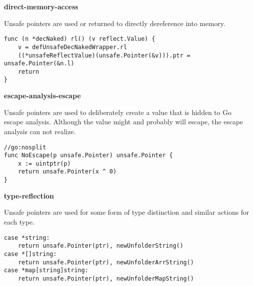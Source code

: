 \textbf{direct-memory-access}

Unsafe pointers are used or returned to directly dereference into memory.

\begin{lstlisting}[language=Golang, label=lst:survey-small-classexample-direct-memory-access, caption=Usage class example: direct-memory-access]
func (n *decNaked) rl() (v reflect.Value) {
    v = defUnsafeDecNakedWrapper.rl
    ((*unsafeReflectValue)(unsafe.Pointer(&v))).ptr = unsafe.Pointer(&n.l)
    return
}
\end{lstlisting}


\textbf{escape-analysis-escape}

Unsafe pointers are used to deliberately create a value that is hidden to Go escape analysis.
Although the value might and probably will escape, the escape analysis can not realize.

\begin{lstlisting}[language=Golang, label=lst:survey-small-classexample-escape-analysis-escape, caption=Usage class example: escape-analysis-escape]
//go:nosplit
func NoEscape(p unsafe.Pointer) unsafe.Pointer {
    x := uintptr(p)
    return unsafe.Pointer(x ^ 0)
}
\end{lstlisting}


\textbf{type-reflection}

Unsafe pointers are used for some form of type distinction and similar actions for each type.

\begin{lstlisting}[language=Golang, label=lst:survey-small-classexample-type-reflection, caption=Usage class example: type-reflection]
case *string:
    return unsafe.Pointer(ptr), newUnfolderString()
case *[]string:
    return unsafe.Pointer(ptr), newUnfolderArrString()
case *map[string]string:
    return unsafe.Pointer(ptr), newUnfolderMapString()
\end{lstlisting}
